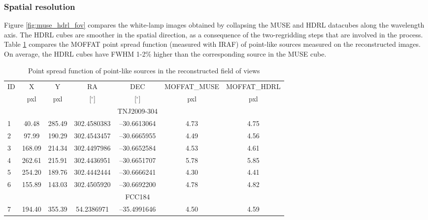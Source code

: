 \subsubsection{Spatial resolution}

Figure \ref{fig:muse_hdrl_fov} compares the white-lamp images obtained
by collapsing the MUSE and HDRL datacubes along the wavelength
axis. The HDRL cubes are smoother in the spatial direction, as a
consequence of the two-regridding steps that are involved in the
process. Table \ref{tab:compare_psf_muse} compares the MOFFAT point
spread function (measured with IRAF) of point-like sources measured on
the reconstructed images. On average, the HDRL cubes have FWHM 1-2\%
higher than the corresponding source in the MUSE cube.

 
\begin{table}
\caption{Point spread function of point-like sources in the reconstructed field of views}
\begin{center}
\begin{tabular}{l c c c c c c}
 ID &  X   &     Y  &     RA    &  DEC        &   MOFFAT\_MUSE& MOFFAT\_HDRL \\
    &  pxl &   pxl  & [$^\circ$] &  [$^\circ$]  &   pxl   &    pxl \\
\hline
    &      &        &           &  TNJ2009-304  &         &         \\
1   &40.48 & 285.49 &302.4580383 &--30.6613064 &  4.73   &  4.75   \\ 
2   &97.99 & 190.29 &302.4543457 &--30.6665955 &  4.49   &  4.56   \\
3   &168.09&  214.34& 302.4497986& --30.6652584&   4.53  &   4.61  \\
4   &262.61&  215.91& 302.4436951& --30.6651707&   5.78  &   5.85  \\
5   &254.20&  189.76& 302.4442444& --30.6666241&   4.30  &   4.41  \\
6   &155.89&  143.03& 302.4505920& --30.6692200&   4.78  &   4.82  \\
    &      &        &            &   FCC184    &         &         \\
7   &194.40&  355.39&  54.2386971& --35.4991646&   4.50  &    4.59 \\ 
\hline
\end{tabular}	
\end{center}																				
\label{tab:compare_psf_muse}
\end{table}




